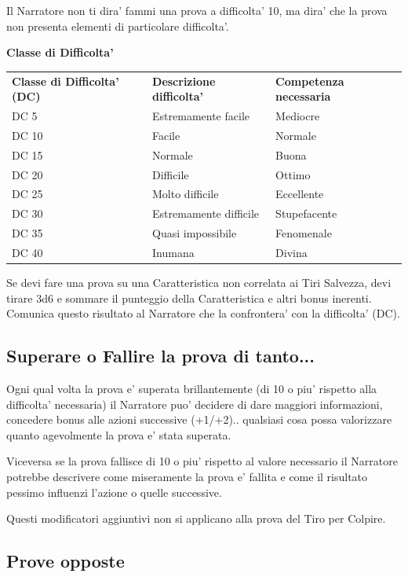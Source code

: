 \documentclass[a4paper,11pt,twoside,openany]{book}
\begin{document}
	Il Narratore non ti dira' fammi una prova a difficolta' 10, ma dira' che la prova non presenta elementi di particolare difficolta'.
	
	\bigskip
	
	\textbf{Classe di Difficolta'}
	\medskip
	
	\begin{tabular}{lll}
		\toprule
		\textbf{Classe di Difficolta' (DC)} & \textbf{Descrizione difficolta'} &\textbf{ Competenza necessaria}\tabularnewline
		DC 5 & Estremamente facile & Mediocre\tabularnewline
		DC 10 & Facile & Normale\tabularnewline
		DC 15 & Normale & Buona\tabularnewline
		DC 20 & Difficile & Ottimo\tabularnewline
		DC 25 & Molto difficile & Eccellente\tabularnewline
		DC 30 & Estremamente difficile & Stupefacente\tabularnewline
		DC 35 & Quasi impossibile & Fenomenale\tabularnewline
		DC 40 & Inumana & Divina\tabularnewline
		
	\end{tabular}
	
	\bigskip
	
	Se devi fare una prova su una Caratteristica non correlata ai Tiri Salvezza, devi tirare 3d6 e sommare il punteggio della Caratteristica e altri bonus inerenti. Comunica questo risultato al Narratore che la confrontera' con la difficolta' (DC).
	
	\subsection{Superare o Fallire la prova di tanto...}
	
	Ogni qual volta la prova e' superata brillantemente (di 10 o piu' rispetto alla difficolta' necessaria) il Narratore puo' decidere di dare maggiori informazioni, concedere bonus alle azioni successive (+1/+2).. qualsiasi cosa possa valorizzare quanto agevolmente la prova e' stata superata.
	
	Viceversa se la prova fallisce di 10 o piu' rispetto al valore necessario il Narratore potrebbe descrivere come miseramente la prova e' fallita e come il risultato pessimo influenzi l'azione o quelle successive.
	
	Questi modificatori aggiuntivi non si applicano alla prova del Tiro per Colpire.
	
	\subsection{Prove opposte}
	
\end{document}
